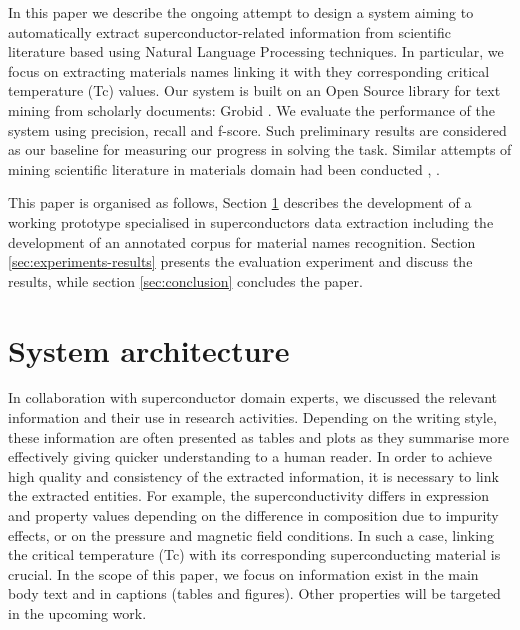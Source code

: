\documentclass{article}[a4]
\begin{document}

In this paper we describe the ongoing attempt to design a system aiming to automatically extract superconductor-related information from scientific literature based using Natural Language Processing techniques. In particular, we focus on extracting materials names linking it with they corresponding critical temperature (Tc) values.
Our system is built on an Open Source library for text mining from scholarly documents: Grobid \cite{GROBID}. We evaluate the performance of the system using precision, recall and f-score. Such preliminary results are considered as our baseline for measuring our progress in solving the task.
Similar attempts of mining scientific literature in materials domain had been conducted  \cite{nanocrystal_extraction}, \cite{court2018auto}. 

This paper is organised as follows, Section \ref{sec:architecture} describes the development of a working prototype specialised in superconductors data extraction including the development of an annotated corpus for material names recognition. Section \ref{sec:experiments-results}  presents the evaluation experiment and discuss the results, while section \ref{sec:conclusion}  concludes the paper.

\section{System architecture}
\label{sec:architecture}
In collaboration with superconductor domain experts, we discussed the relevant information and their use in research activities. Depending on the writing style, these information are often presented as tables and plots as they summarise more effectively giving quicker understanding to a human reader. In order to achieve high quality and consistency of the extracted information, it is necessary to link the extracted entities. For example, the superconductivity differs in expression and property values depending on the difference in composition due to impurity effects, or on the pressure and magnetic field conditions. In such a case, linking the critical temperature (Tc) with its corresponding superconducting material is crucial. In the scope of this paper, we focus on information exist in the main body text and in captions (tables and figures). Other properties will be targeted in the upcoming work.
\end{document}
